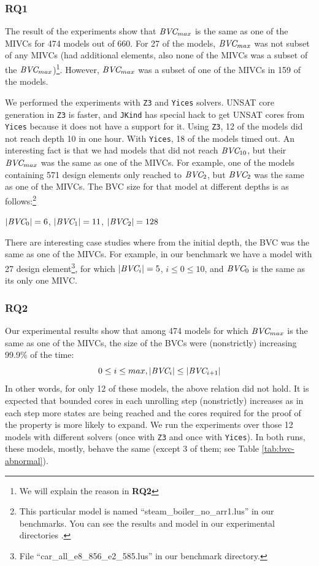 \vspace{0.1in}
\subsubsection{RQ1}
The result of the experiments show that $\textit{BVC} _{max}$ is the same as one of the MIVCs for 474 models out of 660. For 27 of the models, $\textit{BVC} _{max}$ was not subset of any MIVCs (had additional elements, also none of the MIVCs was a subset of the $\textit{BVC} _{max}$)\footnote{We will explain the reason in \textbf{RQ2}}. However, $\textit{BVC} _{max}$ was a subset of one of the MIVCs in 159 of the models.

We performed the experiments with \texttt{Z3} and \texttt{Yices} solvers. UNSAT core generation in \texttt{Z3} is faster, and \texttt{JKind} has special hack to get UNSAT cores from \texttt{Yices} because it does not have a support for it. Using \texttt{Z3}, 12 of the models did not reach depth 10 in one hour. With \texttt{Yices}, 18 of the models timed out. An interesting fact is that we had models that did not reach $\textit{BVC} _{10}$, but their $\textit{BVC} _{max}$ was the same as one of the MIVCs. For example, one of the models containing 571 design elements only reached to $\textit{BVC} _{2}$, but $\textit{BVC} _{2}$ was the same as one of the MIVCs.
The BVC size for that model at different depths is as follows:\footnote{This particular model is named ``steam\_boiler\_no\_arr1.lus'' in our benchmarks. You can see the results and model in our experimental directories \cite{expr}.}

$|\textit{BVC} _{0}| = 6$, $|\textit{BVC} _{1}| = 11$, $|\textit{BVC} _{2}| = 128$

There are interesting case studies where from the initial depth, the BVC was the same as one of the MIVCs. For example, in our benchmark we have a model with 27 design element\footnote{File ``car\_all\_e8\_856\_e2\_585.lus'' in our benchmark directory.}, for which $|\textit{BVC} _{i}| = 5$, $i \leq 0 \le 10$, and $\textit{BVC} _{0}$ is the same as its only one MIVC.

\vspace{0.1in}
\subsubsection{RQ2}
Our experimental results show that among 474 models for which $\textit{BVC} _{max}$ is the same as one of the MIVCs, the size of the BVCs were (nonstrictly) increasing 99.9\% of the time:
      $$ 0 \leq i \le max, |\textit{BVC} _{i}| \leq |\textit{BVC} _{i+1}|$$
      In other words, for only 12 of these models, the above relation did not hold.
      It is expected that bounded cores in each unrolling step (nonstrictly) increases as in each step more states are being reached and the cores required for the proof of the property is more likely to expand.
      We run the experiments over those 12 models with different solvers (once with \texttt{Z3} and once with \texttt{Yices}). In both runs, these models, mostly, behave the same (except 3 of them; see Table \ref{tab:bvc-abnormal}).

